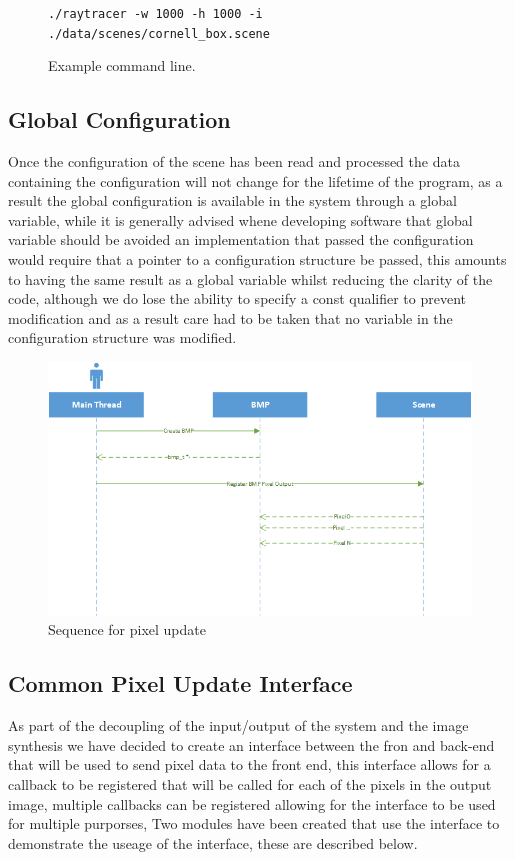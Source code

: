 \begin{figure}[h]
\texttt{./raytracer -w 1000 -h 1000 -i ./data/scenes/cornell\_box.scene}
\caption{Example command line.}
\end{figure}

\subsection{Global Configuration}
Once the configuration of the scene has been read and processed the data containing the configuration will not change for
the lifetime of the program, as a result the global configuration is available in the system through a global variable, while
it is generally advised whene developing software that global variable should be avoided an implementation that passed the
configuration would require that a pointer to a configuration structure be passed, this amounts to having the same result
as a global variable whilst reducing the clarity of the code, although we do lose the ability to specify a const qualifier
to prevent modification and as a result care had to be taken that no variable in the configuration structure was modified.

\begin{figure}
\centering
\includegraphics[width=\textwidth]{./images/pixel_update_sequence.png}
\caption{Sequence for pixel update}
\end{figure}

\subsection{Common Pixel Update Interface}
As part of the decoupling of the input/output of the system and the image synthesis we have decided to create an interface
between the fron and back-end that will be used to send pixel data to the front end, this interface allows for a callback to
be registered that will be called for each of the pixels in the output image, multiple callbacks can be registered allowing
for the interface to be used for multiple purporses, Two modules have been created that use the interface to demonstrate the
useage of the interface, these are described below.

